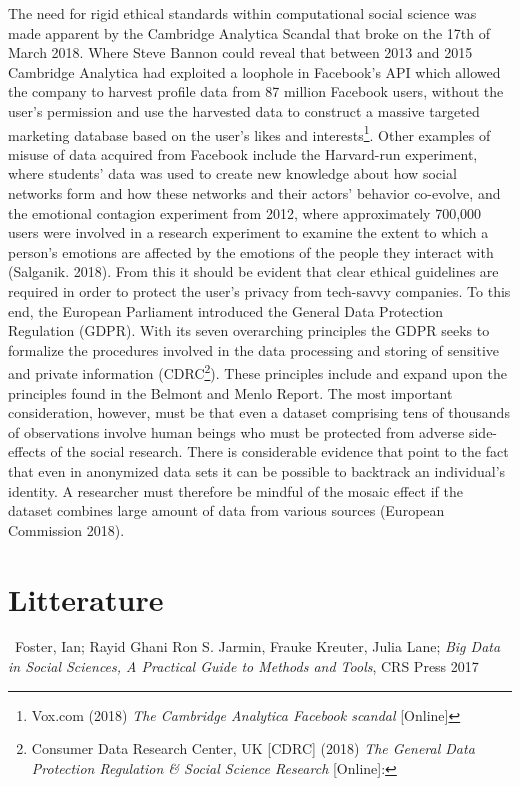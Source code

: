 \documentclass[12pt,a4paper]{article}
\begin{document}
The need for rigid ethical standards within computational social science was made apparent by the Cambridge Analytica Scandal that broke on the 17th of March 2018. Where Steve Bannon could reveal that between 2013 and 2015 Cambridge Analytica had exploited a loophole in Facebook’s API which allowed the company to harvest profile data from 87 million Facebook users, without the user’s permission and use the harvested data to construct a massive targeted marketing database based on the user’s likes and interests\footnote{Vox.com (2018) \textit{The Cambridge Analytica Facebook scandal} [Online]}. Other examples of misuse of data acquired from Facebook include the Harvard-run experiment, where students' data was used to create new knowledge about how social networks form and how these networks and their actors' behavior co-evolve, and the emotional contagion experiment from 2012, where approximately 700,000 users were involved in a research experiment to examine the extent to which a person's emotions are affected by the emotions of the people they interact with (Salganik. 2018).\newline
From this it should be evident that clear ethical guidelines are required in order to protect the user's privacy from tech-savvy companies. To this end, the European Parliament introduced the General Data Protection Regulation (GDPR). With its seven overarching principles the GDPR seeks to formalize the procedures involved in the data processing and storing of sensitive and private information (CDRC\footnote{Consumer Data Research Center, UK  [CDRC] (2018) \textit{The General Data Protection Regulation \& Social Science Research} [Online]:}). These principles include and expand upon the principles found in the Belmont and Menlo Report. The most important consideration, however, must be that even a dataset comprising tens of thousands of observations involve human beings who must be protected from adverse side-effects of the social research. There is considerable evidence that point to the fact that even in anonymized data sets it can be possible to backtrack an individual's identity. A researcher must therefore be mindful of the mosaic effect if the dataset combines large amount of data from various sources (European Commission 2018).

\newpage
\section{Litterature}
\ Foster, Ian; Rayid Ghani Ron S. Jarmin, Frauke Kreuter, Julia Lane; \textit{Big Data in Social Sciences, A Practical Guide to Methods and Tools}, CRS Press 2017 \newline
\end{document}
